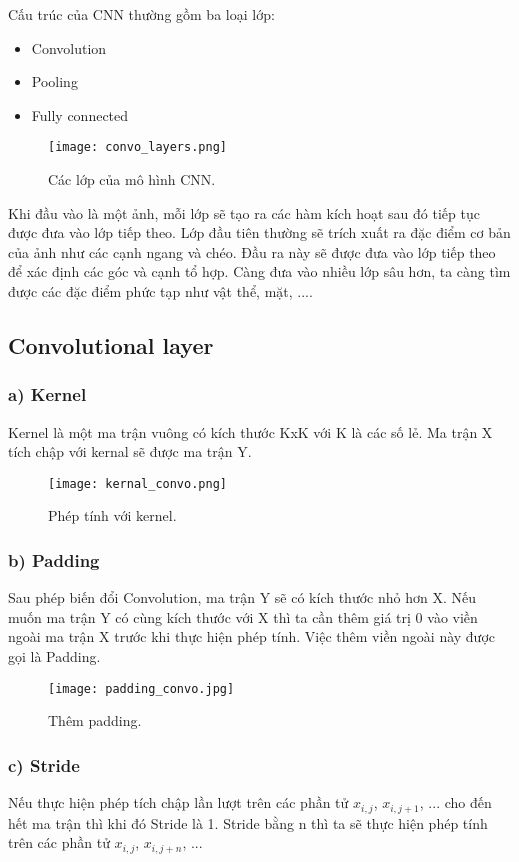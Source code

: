 Cấu trúc của CNN thường gồm ba loại lớp:
\begin{itemize}
	\item Convolution
	\item Pooling
	\item Fully connected 
\end{itemize} 

\begin{figure}[h!]
	\centering
	\texttt{[image: convo\_layers.png]}
	\caption{Các lớp của mô hình CNN.}
\end{figure} 

Khi đầu vào là một ảnh, mỗi lớp sẽ tạo ra các hàm kích hoạt sau đó tiếp tục được đưa vào lớp tiếp theo. Lớp đầu tiên thường sẽ trích xuất ra đặc điểm cơ bản của ảnh như các cạnh ngang và chéo. Đầu ra này sẽ được đưa vào lớp tiếp theo để xác định các góc và cạnh tổ hợp. Càng đưa vào nhiều lớp sâu hơn, ta càng tìm được các đặc điểm phức tạp như vật thể, mặt, ...\cite{web:2}.

\newpage
\subsection{Convolutional layer}
\subsubsection{a) Kernel}
Kernel là một ma trận vuông có kích thước KxK với K là các số lẻ. Ma trận X tích chập với kernal sẽ được ma trận Y.
\begin{figure}[h!]
	\centering
	\texttt{[image: kernal\_convo.png]}
	\caption{Phép tính với kernel.}
\end{figure} 

\subsubsection{b) Padding}
Sau phép biến đổi Convolution, ma trận Y sẽ có kích thước nhỏ hơn X. Nếu muốn ma trận Y có cùng kích thước với X thì ta cần thêm giá trị 0 vào viền ngoài ma trận X trước khi thực hiện phép tính. Việc thêm viền ngoài này được gọi là Padding.

\begin{figure}[h!]
	\centering
	\texttt{[image: padding\_convo.jpg]}
	\caption{Thêm padding.}
\end{figure} 

\subsubsection{c) Stride}
Nếu thực hiện phép tích chập lần lượt trên các phần tử $x_{i,j}$, $x_{i,j+1}$, ... cho đến hết ma trận thì khi đó Stride là 1. Stride bằng n thì ta sẽ thực hiện phép tính trên các phần tử $x_{i,j}$, $x_{i,j+n}$, ...

